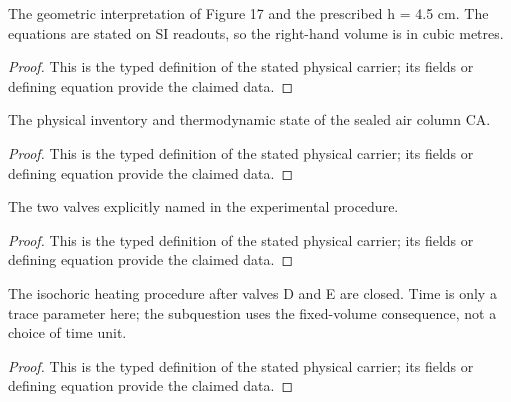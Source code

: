 \begin{definition}
  \label{def:physics:IPhO_2026_4_A_1:aux016}
  The geometric interpretation of Figure 17 and the prescribed h = 4.5 cm. The equations are stated on SI readouts, so the right-hand volume is in cubic metres.
\end{definition}
\begin{proof}
  This is the typed definition of the stated physical carrier; its fields or defining equation provide the claimed data.
\end{proof}

\begin{definition}
  \label{def:physics:IPhO_2026_4_A_1:aux017}
  The physical inventory and thermodynamic state of the sealed air column CA.
\end{definition}
\begin{proof}
  This is the typed definition of the stated physical carrier; its fields or defining equation provide the claimed data.
\end{proof}

\begin{definition}
  \label{def:physics:IPhO_2026_4_A_1:aux018}
  The two valves explicitly named in the experimental procedure.
\end{definition}
\begin{proof}
  This is the typed definition of the stated physical carrier; its fields or defining equation provide the claimed data.
\end{proof}

\begin{definition}
  \label{def:physics:IPhO_2026_4_A_1:aux019}
  The isochoric heating procedure after valves D and E are closed. Time is only a trace parameter here; the subquestion uses the fixed-volume consequence, not a choice of time unit.
\end{definition}
\begin{proof}
  This is the typed definition of the stated physical carrier; its fields or defining equation provide the claimed data.
\end{proof}

